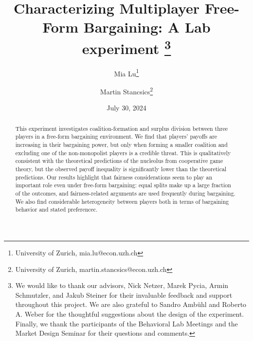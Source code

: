 \documentclass[a4paper]{article}
\title{
    Characterizing Multiplayer Free-Form Bargaining: A Lab experiment%
    \thanks{
        We would like to thank our advisors, Nick Netzer, Marek Pycia, Armin Schmutzler, and Jakub Steiner for their invaluable feedback and support throughout this project.
        We are also grateful to Sandro Ambühl and Roberto A. Weber for the thoughtful suggestions about the design of the experiment.
        Finally, we thank the participants of the Behavioral Lab Meetings and the Market Design Seminar for their questions and comments.
    }
}
\author{
    Mia Lu\thanks{University of Zurich, mia.lu@econ.uzh.ch} 
    \and 
    Martin Stancsics\thanks{University of Zurich, martin.stancsics@econ.uzh.ch}
}
\date{July 30, 2024 \\\vspace{0.4cm} \latestversion}
\begin{document}
\maketitle

\begin{abstract}
    This experiment investigates coalition-formation and surplus division between three players in a free-form bargaining environment.
    We find that players’ payoffs are increasing in their bargaining power, but only when forming a smaller coalition and excluding one of the non-monopolist players is a credible threat.
    This is qualitatively consistent with the theoretical predictions of the nucleolus from cooperative game theory, but the observed payoff inequality is significantly lower than the theoretical predictions.
    Our results highlight that fairness considerations seem to play an important role even under free-form bargaining: equal splits make up a large fraction of the outcomes, and fairness-related arguments are used frequently during bargaining.
    We also find considerable heterogeneity between players both in terms of bargaining behavior and stated preferencec.
\end{abstract}



\appendix

\printbibliography


\end{document}
